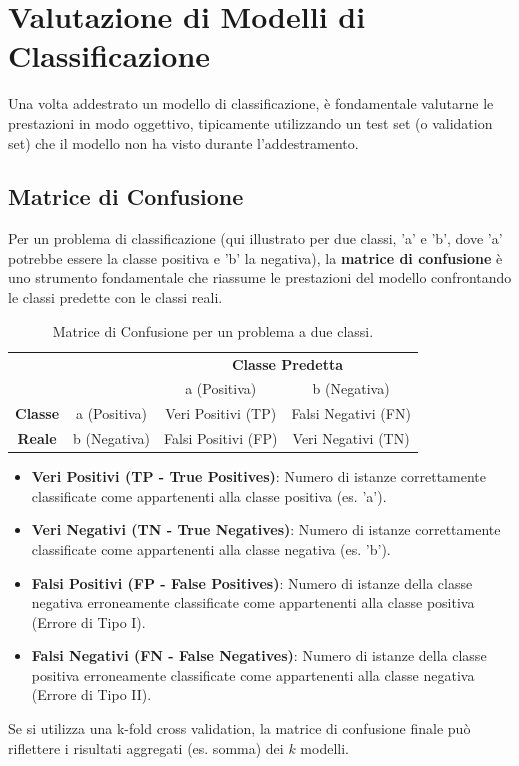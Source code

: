 \documentclass{article}
\begin{document}
\section{Valutazione di Modelli di Classificazione}

Una volta addestrato un modello di classificazione, è fondamentale valutarne le prestazioni in modo oggettivo, tipicamente utilizzando un test set (o validation set) che il modello non ha visto durante l'addestramento.

\subsection{Matrice di Confusione}
Per un problema di classificazione (qui illustrato per due classi, 'a' e 'b', dove 'a' potrebbe essere la classe positiva e 'b' la negativa), la \textbf{matrice di confusione} è uno strumento fondamentale che riassume le prestazioni del modello confrontando le classi predette con le classi reali.

\begin{table}[H]
    \centering
    \caption{Matrice di Confusione per un problema a due classi.}
    \label{tab:confusion_matrix}
    \begin{tabular}{cc|cc}
                        &              & \multicolumn{2}{c}{\textbf{Classe Predetta}}                       \\
                        &              & a (Positiva)                                 & b (Negativa)        \\
        \hline
        \textbf{Classe} & a (Positiva) & Veri Positivi (TP)                           & Falsi Negativi (FN) \\
        \textbf{Reale}  & b (Negativa) & Falsi Positivi (FP)                          & Veri Negativi (TN)  \\
    \end{tabular}
\end{table}

\begin{itemize}
    \item \textbf{Veri Positivi (TP - True Positives)}: Numero di istanze correttamente classificate come appartenenti alla classe positiva (es. 'a').
    \item \textbf{Veri Negativi (TN - True Negatives)}: Numero di istanze correttamente classificate come appartenenti alla classe negativa (es. 'b').
    \item \textbf{Falsi Positivi (FP - False Positives)}: Numero di istanze della classe negativa erroneamente classificate come appartenenti alla classe positiva (Errore di Tipo I).
    \item \textbf{Falsi Negativi (FN - False Negatives)}: Numero di istanze della classe positiva erroneamente classificate come appartenenti alla classe negativa (Errore di Tipo II).
\end{itemize}
Se si utilizza una k-fold cross validation, la matrice di confusione finale può riflettere i risultati aggregati (es. somma) dei $k$ modelli.
\end{document}
